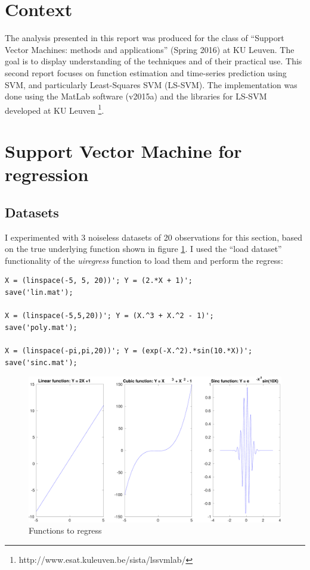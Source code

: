 \documentclass[11pt, a4paper]{article}
\begin{document}

\tableofcontents
\newpage

\section*{Context}

The analysis presented in this report was produced for the class of
``Support Vector Machines: methods and applications'' (Spring 2016) at
KU Leuven. The goal is to display understanding of the techniques and
of their practical use. This second report focuses on function
estimation and time-series prediction using SVM, and particularly
Least-Squares SVM (LS-SVM). The implementation was done using the
MatLab software (v2015a) and the libraries for LS-SVM developed at KU
Leuven \footnote{http://www.esat.kuleuven.be/sista/lssvmlab/}.

\section{Support Vector Machine for regression}

\subsection{Datasets}
I experimented with 3 noiseless datasets of 20 observations for this
section, based on the true underlying function shown in figure
\ref{fig:regress_datasets}. I used the ``load dataset'' functionality
of the \emph{uiregress} function to load them and perform the regress:

\begin{lstlisting}
X = (linspace(-5, 5, 20))'; Y = (2.*X + 1)';
save('lin.mat');

X = (linspace(-5,5,20))'; Y = (X.^3 + X.^2 - 1)';
save('poly.mat');

X = (linspace(-pi,pi,20))'; Y = (exp(-X.^2).*sin(10.*X))';
save('sinc.mat');
\end{lstlisting}

\begin{figure}[H]
    \centering
    \includegraphics[scale=.30]{datasets.pdf}
    \caption{Functions to regress}
    \label{fig:regress_datasets}
\end{figure}
\end{document}
